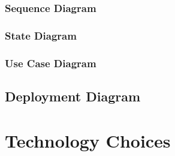 \documentclass{article}
\begin{document}
			
			\subsubsection{Sequence Diagram}\label{subsec:uml-diagrams-users-seq}
						
			
			\subsubsection{State Diagram}\label{subsec:uml-diagrams-users-state}
			
			
			\subsubsection{Use Case Diagram}\label{subsec:uml-diagrams-users-uc}
		
	\clearpage
	
	\subsection{Deployment Diagram}\label{subsec:deployment-diagram}

	\clearpage
	
	\section{Technology Choices}\label{sec:technology-choices}
\end{document}
